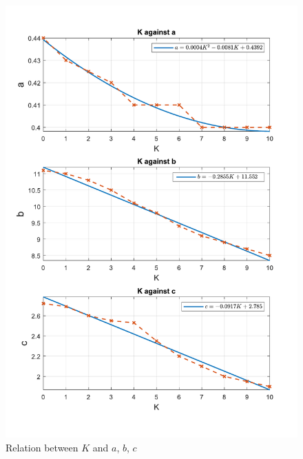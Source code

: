 \begin{figure}
	\centering
	\includegraphics[width=\textwidth]{Graphics/Methodology/KcoeffFit.pdf}
	\caption{Relation between \(K\) and \(a\), \(b\), \(c\)}
	\label{fig:findKcoeff}
\end{figure}
